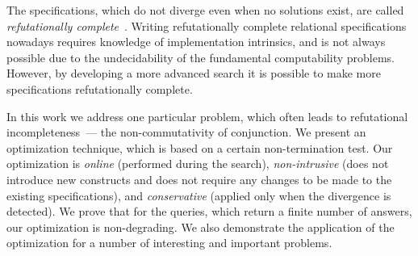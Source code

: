 The specifications, which do not diverge even when no solutions exist, are called \emph{refutationally complete}~\cite{WillThesis}. Writing 
refutationally complete relational specifications nowadays requires knowledge of \miniKanren implementation intrinsics, and is not always
possible due to the undecidability of the fundamental computability problems. However, by developing a more advanced search it is possible
to make more specifications refutationally complete.

In this work we address one particular problem, which often leads to refutational incompleteness~--- the non-commutativity of
conjunction. We present an optimization technique, which is based on a certain non-termination test. Our optimization
is \emph{online} (performed during the search), \emph{non-intrusive} (does not introduce new constructs and does not require
any changes to be made to the existing specifications), and \emph{conservative} (applied only when the divergence
is detected). We prove that for the queries, which return a finite number of answers, our optimization is non-degrading. 
We also demonstrate the application of the optimization for a number of interesting and important problems.
